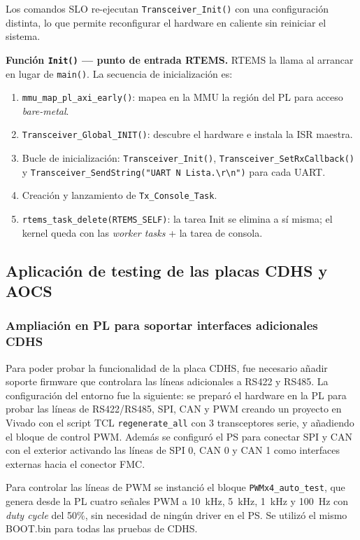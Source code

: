 Los comandos SLO re-ejecutan \texttt{Transceiver\_Init()} con una configuración distinta, lo que
permite reconfigurar el hardware en caliente sin reiniciar el sistema.

\textbf{Función \texttt{Init()} --- punto de entrada RTEMS.} RTEMS la llama al arrancar en lugar
de \texttt{main()}. La secuencia de inicialización es:

\begin{enumerate}
    \item \texttt{mmu\_map\_pl\_axi\_early()}: mapea en la MMU la región del PL para acceso \textit{bare-metal}.
    \item \texttt{Transceiver\_Global\_INIT()}: descubre el hardware e instala la ISR maestra.
    \item Bucle de inicialización: \texttt{Transceiver\_Init()}, \texttt{Transceiver\_SetRxCallback()} y
    \texttt{Transceiver\_SendString("UART N Lista.\textbackslash r\textbackslash n")} para cada UART.
    \item Creación y lanzamiento de \texttt{Tx\_Console\_Task}.
    \item \texttt{rtems\_task\_delete(RTEMS\_SELF)}: la tarea Init se elimina a sí misma; el
    kernel queda con las \textit{worker tasks} + la tarea de consola.
\end{enumerate}

\subsection{Aplicación de testing de las placas CDHS y AOCS}

\subsubsection{Ampliación en PL para soportar interfaces adicionales CDHS}

Para poder probar la funcionalidad de la placa CDHS, fue necesario añadir soporte firmware
que controlara las líneas adicionales a RS422 y RS485. La configuración del entorno fue la
siguiente: se preparó el hardware en la PL para probar las líneas de RS422/RS485, SPI, CAN
y PWM creando un proyecto en Vivado con el script TCL \texttt{regenerate\_all} con 3
transceptores serie, y añadiendo el bloque de control PWM. Además se configuró el PS para
conectar SPI y CAN con el exterior activando las líneas de SPI 0, CAN 0 y CAN 1 como
interfaces externas hacia el conector FMC.

Para controlar las líneas de PWM se instanció el bloque \texttt{PWMx4\_auto\_test}, que genera
desde la PL cuatro señales PWM a 10~kHz, 5~kHz, 1~kHz y 100~Hz con \textit{duty cycle} del
50\%, sin necesidad de ningún driver en el PS. Se utilizó el mismo BOOT.bin para todas las
pruebas de CDHS.


